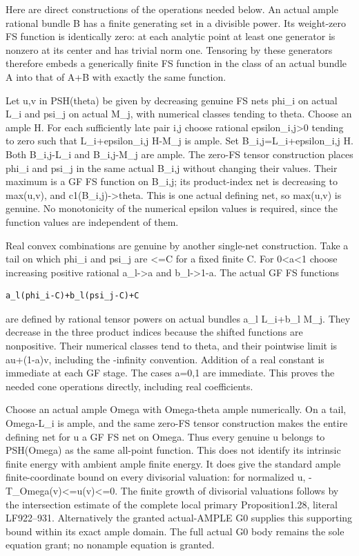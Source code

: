 \documentclass[
  10pt,
]{article}
\begin{document}
Here are direct constructions of the operations needed below. An actual
ample rational bundle B has a finite generating set in a divisible
power. Its weight-zero FS function is identically zero: at each analytic
point at least one generator is nonzero at its center and has trivial
norm one. Tensoring by these generators therefore embeds a generically
finite FS function in the class of an actual bundle A into that of A+B
with exactly the same function.

Let u,v in PSH(theta) be given by decreasing genuine FS nets phi\_i on
actual L\_i and psi\_j on actual M\_j, with numerical classes tending to
theta. Choose an ample H. For each sufficiently late pair i,j choose
rational epsilon\_i,j\textgreater0 tending to zero such that
L\_i+epsilon\_i,j H-M\_j is ample. Set B\_i,j=L\_i+epsilon\_i,j H. Both
B\_i,j-L\_i and B\_i,j-M\_j are ample. The zero-FS tensor construction
places phi\_i and psi\_j in the same actual B\_i,j without changing
their values. Their maximum is a GF FS function on B\_i,j; its
product-index net is decreasing to max(u,v), and
c1(B\_i,j)-\textgreater theta. This is one actual defining net, so
max(u,v) is genuine. No monotonicity of the numerical epsilon values is
required, since the function values are independent of them.

Real convex combinations are genuine by another single-net construction.
Take a tail on which phi\_i and psi\_j are \textless=C for a fixed
finite C. For 0\textless a\textless1 choose increasing positive rational
a\_l-\textgreater a and b\_l-\textgreater1-a. The actual GF FS functions

\begin{verbatim}
a_l(phi_i-C)+b_l(psi_j-C)+C
\end{verbatim}

are defined by rational tensor powers on actual bundles a\_l L\_i+b\_l
M\_j. They decrease in the three product indices because the shifted
functions are nonpositive. Their numerical classes tend to theta, and
their pointwise limit is au+(1-a)v, including the -infinity convention.
Addition of a real constant is immediate at each GF stage. The cases
a=0,1 are immediate. This proves the needed cone operations directly,
including real coefficients.

Choose an actual ample Omega with Omega-theta ample numerically. On a
tail, Omega-L\_i is ample, and the same zero-FS tensor construction
makes the entire defining net for u a GF FS net on Omega. Thus every
genuine u belongs to PSH(Omega) as the same all-point function. This
does not identify its intrinsic finite energy with ambient ample finite
energy. It does give the standard ample finite-coordinate bound on every
divisorial valuation: for normalized u,
-T\_Omega(v)\textless=u(v)\textless=0. The finite growth of divisorial
valuations follows by the intersection estimate of the complete local
primary Proposition1.28, literal LF922--931. Alternatively the granted
actual-AMPLE G0 supplies this supporting bound within its exact ample
domain. The full actual G0 body remains the sole equation grant; no
nonample equation is granted.
\end{document}

